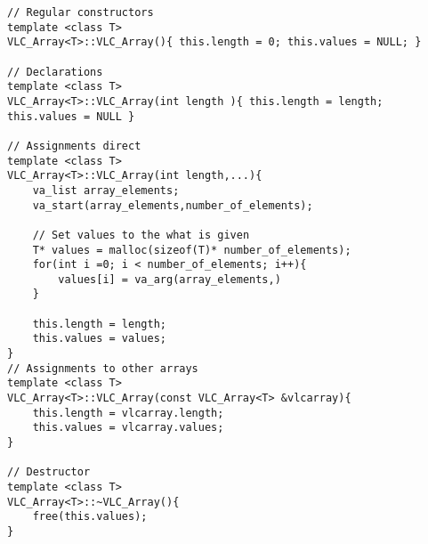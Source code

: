 \begin{verbatim}
// Regular constructors
template <class T>
VLC_Array<T>::VLC_Array(){ this.length = 0; this.values = NULL; }

// Declarations
template <class T>
VLC_Array<T>::VLC_Array(int length ){ this.length = length; this.values = NULL }

// Assignments direct
template <class T>
VLC_Array<T>::VLC_Array(int length,...){
	va_list array_elements;
	va_start(array_elements,number_of_elements);

	// Set values to the what is given
	T* values = malloc(sizeof(T)* number_of_elements);
	for(int i =0; i < number_of_elements; i++){
		values[i] = va_arg(array_elements,)
	}

	this.length = length;
	this.values = values;
}
// Assignments to other arrays
template <class T>
VLC_Array<T>::VLC_Array(const VLC_Array<T> &vlcarray){
	this.length = vlcarray.length;
	this.values = vlcarray.values;
}

// Destructor
template <class T>
VLC_Array<T>::~VLC_Array(){
	free(this.values);
}

\end{verbatim}	